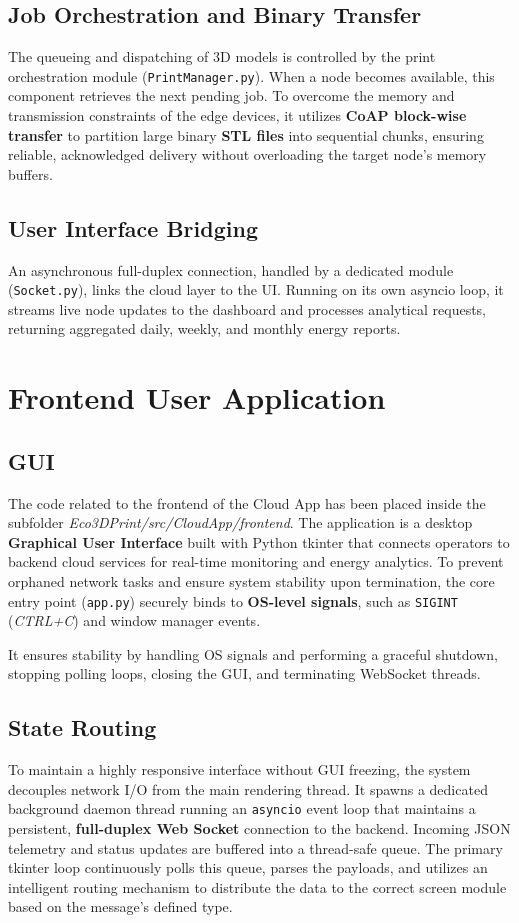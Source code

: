 \subsection{Job Orchestration and Binary Transfer}
The queueing and dispatching of 3D models is controlled by the print orchestration module (\texttt{PrintManager.py}). When a node becomes available, this component retrieves the next pending job. To overcome the memory and transmission constraints of the edge devices, it utilizes \textbf{CoAP block-wise transfer} to partition large binary \textbf{STL files} into sequential chunks, ensuring reliable, acknowledged delivery without overloading the target node's memory buffers. 

\subsection{User Interface Bridging}
An asynchronous full-duplex connection, handled by a dedicated module (\texttt{Socket.py}), links the cloud layer to the UI. Running on its own asyncio loop, it streams live node updates to the dashboard and processes analytical requests, returning aggregated daily, weekly, and monthly energy reports. 

\newpage  

\section{Frontend User Application}
\subsection{GUI}
The code related to the frontend of the Cloud App has been placed inside the subfolder \linebreak \textit{Eco3DPrint/src/CloudApp/frontend}. The application is a desktop \textbf{Graphical User Interface} built with Python tkinter that connects operators to backend cloud services for real-time monitoring and energy analytics. To prevent orphaned network tasks and ensure system stability upon termination, the core entry point (\texttt{app.py}) securely binds to \textbf{OS-level signals}, such as \texttt{SIGINT} (\textit{CTRL+C}) and window manager events. 

It ensures stability by handling OS signals and performing a graceful shutdown, stopping polling loops, closing the GUI, and terminating WebSocket threads. 

\subsection{State Routing}
To maintain a highly responsive interface without GUI freezing, the system decouples network I/O from the main rendering thread. It spawns a dedicated background daemon thread running an \texttt{asyncio} event loop that maintains a persistent, \textbf{full-duplex Web Socket} connection to the backend. Incoming JSON telemetry and status updates are buffered into a thread-safe queue. The primary tkinter loop continuously polls this queue, parses the payloads, and utilizes an intelligent routing mechanism to distribute the data to the correct screen module based on the message's defined type.

